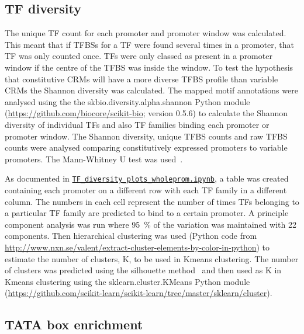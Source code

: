 \documentclass[../main.tex]{subfiles}
\begin{document}
\subsection{TF diversity}
{\label{chapter1:methods:tf-diversity}}

The unique TF count for each promoter and promoter window was calculated. This meant that if TFBSs for a TF were found several times in a promoter, that TF was only counted once.
TFs were only classed as present in a promoter window if the centre of the TFBS was inside the window.
To test the hypothesis that constitutive CRMs will have a more diverse TFBS profile than variable CRMs the Shannon diversity was calculated.
The mapped motif annotations were analysed using the the skbio.diversity.alpha.shannon Python module (\url{https://github.com/biocore/scikit-bio}; version 0.5.6) to calculate the Shannon diversity of individual TFs and also TF families binding each promoter or promoter window.
The Shannon diversity, unique TFBS counts and raw TFBS counts were analysed comparing constitutively expressed promoters to variable promoters.
The Mann\hyp{}Whitney U test was used~\autocite{mannTestWhetherOne1947}.

As documented in \href{https://github.com/Switham1/PromoterArchitecture/blob/master/src/plotting/TF_diversity_plots_wholeprom.ipynb}{\texttt{TF\_diversity\_plots\_wholeprom.ipynb}}, a table was created containing each promoter on a different row with each TF family in a different column.
The numbers in each cell represent the number of times TFs belonging to a particular TF family are predicted to bind to a certain promoter.
A principle component analysis was run where \SI{95}{\percent} of the variation was maintained with 22 components.
Then hierarchical clustering was used (Python code from \url{http://www.nxn.se/valent/extract-cluster-elements-by-color-in-python}) to estimate the number of clusters, K, to be used in Kmeans clustering.
The number of clusters was predicted using the silhouette method~\autocite{rousseeuwSilhouettesGraphicalAid1987} and then used as K in Kmeans clustering using the sklearn.cluster.KMeans Python module (\url{https://github.com/scikit-learn/scikit-learn/tree/master/sklearn/cluster}).

\subsection{TATA box enrichment}
\label{chapter1:methods:tata-box-enrichment}
\end{document}
